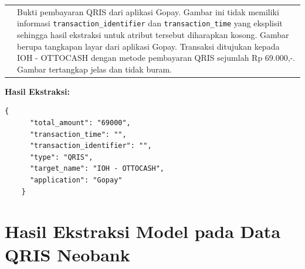\begin{table}[h!]
\begin{tabularx}{\textwidth}{m{} X}
        & 
        Bukti pembayaran QRIS dari aplikasi Gopay. Gambar ini tidak memiliki informasi \texttt{transaction\_identifier} dan \texttt{transaction\_time} yang eksplisit sehingga hasil ekstraksi untuk atribut tersebut diharapkan kosong. Gambar berupa tangkapan layar dari aplikasi Gopay. Transaksi ditujukan kepada IOH - OTTOCASH dengan metode pembayaran QRIS sejumlah Rp 69.000,-. Gambar tertangkap jelas dan tidak buram. \\
    \end{tabularx}
\end{table}

\textbf{Hasil Ekstraksi:}
\begin{lstlisting}[style=jsonstyle]
    {
      "total_amount": "69000",
      "transaction_time": "",
      "transaction_identifier": "",
      "type": "QRIS",
      "target_name": "IOH - OTTOCASH",
      "application": "Gopay"
    }
\end{lstlisting}

\clearpage

\section{Hasil Ekstraksi Model pada Data QRIS Neobank}

